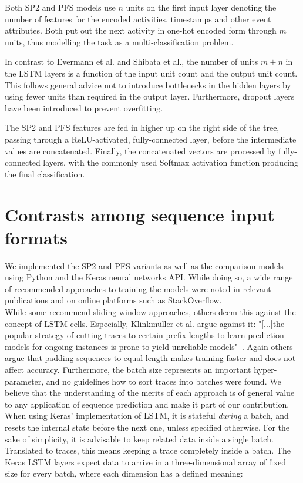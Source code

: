 Both SP2 and PFS models use $n$ units on the first input layer denoting the number of features for the encoded activities, timestamps and other event attributes. Both put out the next activity in one-hot encoded form through $m$ units, thus modelling the task as a multi-classification problem.

In contrast to Evermann et al. and Shibata et al., the number of units $m+n$ in the LSTM layers is a function of the input unit count and the output unit count. This follows general advice not to introduce bottlenecks in the hidden layers by using fewer units than required in the output layer. Furthermore, dropout layers have been introduced to prevent overfitting.

The SP2 and PFS features are fed in higher up on the right side of the tree, passing through a ReLU-activated, fully-connected layer, before the intermediate values are concatenated. Finally, the concatenated vectors are processed by fully-connected layers, with the commonly used Softmax activation function producing the final classification.

\section{Contrasts among sequence input formats}
\label{sec:contrib:input-formatting}
We implemented the SP2 and PFS variants as well as the comparison models using Python and the Keras neural networks API. While doing so, a wide range of recommended approaches to training the models were noted in relevant publications and on online platforms such as StackOverflow.\\

While some recommend sliding window approaches, others deem this against the concept of LSTM cells. Especially, Klinkmüller et al. argue against it: "[...]the popular strategy of cutting traces to certain prefix lengths to learn prediction models for ongoing instances is prone to yield unreliable models"~\cite{klinkmuller2018reliablemonitoring}. Again others argue that padding sequences to equal length makes training faster and does not affect accuracy. Furthermore, the batch size represents an important hyper-parameter, and no guidelines how to sort traces into batches were found. We believe that the understanding of the merits of each approach is of general value to any application of sequence prediction and make it part of our contribution.\\

When using Keras' implementation of LSTM, it is stateful \textit{during} a batch, and resets the internal state before the next one, unless specified otherwise. For the sake of simplicity, it is advisable to keep related data inside a single batch. Translated to traces, this means keeping a trace completely inside a batch. The Keras LSTM layers expect data to arrive in a three-dimensional array of fixed size for every batch, where each dimension has a defined meaning:

